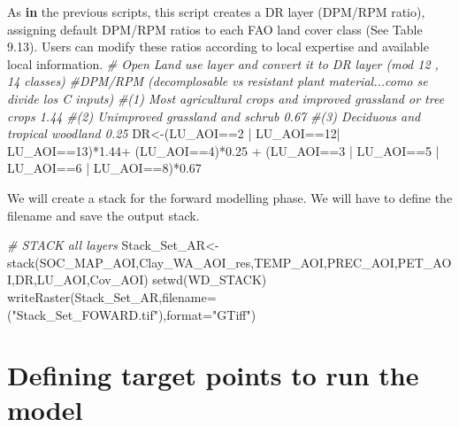 \documentclass[
  10pt,
  b5paper,
]{book}
\newenvironment{Shaded}{\begin{snugshade}}{\end{snugshade}}
\newcommand{\AttributeTok}[1]{\textcolor[rgb]{0.77,0.63,0.00}{#1}}
\newcommand{\CommentTok}[1]{\textcolor[rgb]{0.56,0.35,0.01}{\textit{#1}}}
\newcommand{\ControlFlowTok}[1]{\textcolor[rgb]{0.13,0.29,0.53}{\textbf{#1}}}
\newcommand{\DecValTok}[1]{\textcolor[rgb]{0.00,0.00,0.81}{#1}}
\newcommand{\FloatTok}[1]{\textcolor[rgb]{0.00,0.00,0.81}{#1}}
\newcommand{\FunctionTok}[1]{\textcolor[rgb]{0.00,0.00,0.00}{#1}}
\newcommand{\NormalTok}[1]{#1}
\newcommand{\OtherTok}[1]{\textcolor[rgb]{0.56,0.35,0.01}{#1}}
\newcommand{\SpecialCharTok}[1]{\textcolor[rgb]{0.00,0.00,0.00}{#1}}
\newcommand{\StringTok}[1]{\textcolor[rgb]{0.31,0.60,0.02}{#1}}
\begin{document}
\begin{Shaded}
\begin{Highlighting}[]
\NormalTok{As }\ControlFlowTok{in}\NormalTok{ the previous scripts, this script creates a DR }\FunctionTok{layer}\NormalTok{ (DPM}\SpecialCharTok{/}\NormalTok{RPM ratio), assigning default DPM}\SpecialCharTok{/}\NormalTok{RPM ratios to each FAO land cover }\FunctionTok{class}\NormalTok{ (See Table }\FloatTok{9.13}\NormalTok{). Users can modify these ratios according to local expertise and available local information. }
\CommentTok{\# Open Land use layer and convert it to DR layer (mod 12 , 14 classes)}
\CommentTok{\#DPM/RPM (decomplosable vs resistant plant material...como se divide los C inputs)}
\CommentTok{\#(1) Most agricultural crops and improved grassland or tree crops 1.44 }
\CommentTok{\#(2) Unimproved grassland and schrub 0.67}
\CommentTok{\#(3) Deciduous and tropical woodland 0.25    }
\NormalTok{DR}\OtherTok{\textless{}{-}}\NormalTok{(LU\_AOI}\SpecialCharTok{==}\DecValTok{2} \SpecialCharTok{|}\NormalTok{ LU\_AOI}\SpecialCharTok{==}\DecValTok{12}\SpecialCharTok{|}\NormalTok{ LU\_AOI}\SpecialCharTok{==}\DecValTok{13}\NormalTok{)}\SpecialCharTok{*}\FloatTok{1.44}\SpecialCharTok{+}\NormalTok{ (LU\_AOI}\SpecialCharTok{==}\DecValTok{4}\NormalTok{)}\SpecialCharTok{*}\FloatTok{0.25} \SpecialCharTok{+}\NormalTok{ (LU\_AOI}\SpecialCharTok{==}\DecValTok{3} \SpecialCharTok{|}\NormalTok{ LU\_AOI}\SpecialCharTok{==}\DecValTok{5} \SpecialCharTok{|}\NormalTok{ LU\_AOI}\SpecialCharTok{==}\DecValTok{6} \SpecialCharTok{|}\NormalTok{ LU\_AOI}\SpecialCharTok{==}\DecValTok{8}\NormalTok{)}\SpecialCharTok{*}\FloatTok{0.67}
\end{Highlighting}
\end{Shaded}

We will create a stack for the forward modelling phase. We will have to define the filename and save the output stack.

\begin{Shaded}
\begin{Highlighting}[]
\CommentTok{\# STACK all layers}
\NormalTok{Stack\_Set\_AR}\OtherTok{\textless{}{-}}\FunctionTok{stack}\NormalTok{(SOC\_MAP\_AOI,Clay\_WA\_AOI\_res,TEMP\_AOI,PREC\_AOI,PET\_AOI,DR,LU\_AOI,Cov\_AOI)}
\FunctionTok{setwd}\NormalTok{(WD\_STACK)}
\FunctionTok{writeRaster}\NormalTok{(Stack\_Set\_AR,}\AttributeTok{filename=}\NormalTok{(}\StringTok{"Stack\_Set\_FOWARD.tif"}\NormalTok{),}\AttributeTok{format=}\StringTok{"GTiff"}\NormalTok{)}
\end{Highlighting}
\end{Shaded}

\hypertarget{defining-target-points-to-run-the-model}{%
\section{Defining target points to run the model}\label{defining-target-points-to-run-the-model}}
\end{document}
